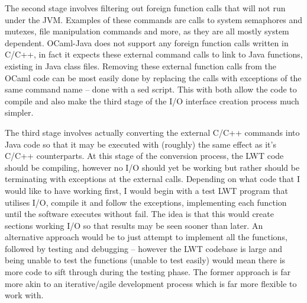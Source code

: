 \documentclass[12pt,twoside,notitlepage]{report}
\begin{document}
The second stage involves filtering out foreign function calls that will not run under the JVM. Examples of these commands are calls to system semaphores and mutexes, file manipulation commands and more, as they are all mostly system
dependent. OCaml-Java does not support any foreign function calls written in C/C++, in fact it expects these external command calls to link to Java functions, existing in Java class files. Removing these external function calls from the
OCaml code can be most easily done by replacing the calls with exceptions of the same command name -- done with a sed script. This with both allow the code to compile and also make the third stage of the I/O interface creation process
much simpler.

The third stage involves actually converting the external C/C++ commands into Java code so that it may be executed with (roughly) the same effect as it's C/C++ counterparts. At this stage of the conversion process, the LWT code
should be compiling, however no I/O should yet be working but rather should be terminating with exceptions at the external calls. Depending on what code that I would like to have working first, I would begin with a test LWT program that
utilises I/O, compile it and follow the exceptions, implementing each function until the software executes without fail. The idea is that this would create sections working I/O so that results may be seen sooner than later. An alternative
approach would be to just attempt to implement all the functions, followed by testing and debugging -- however the LWT codebase is large and being unable to test the functions (unable to test easily) would mean there is more code to
sift through during the testing phase. The former approach is far more akin to an iterative/agile development process which is far more flexible to work with.
\end{document}

